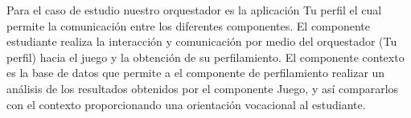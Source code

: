 Para el caso de estudio nuestro orquestador es la aplicación Tu perfil el cual permite la comunicación entre los diferentes componentes. El componente estudiante realiza la interacción y comunicación por medio del orquestador (Tu perfil) hacia el juego y la obtención de su perfilamiento. El componente contexto es la base de datos que permite a el componente de perfilamiento realizar un análisis de los resultados obtenidos por el componente Juego, y así compararlos con el contexto proporcionando una orientación vocacional al estudiante.

\newpage